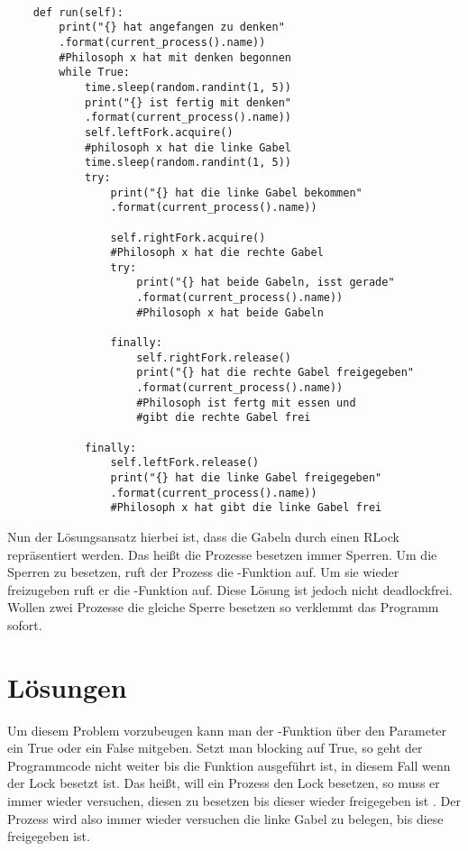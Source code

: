 \begin{lstlisting}[style = Python, label = {erste Lösung}, caption = {erste Lösung}]

    def run(self):
        print("{} hat angefangen zu denken"
        .format(current_process().name)) 
        #Philosoph x hat mit denken begonnen
        while True:
            time.sleep(random.randint(1, 5))
            print("{} ist fertig mit denken"
            .format(current_process().name))
            self.leftFork.acquire() 
            #philosoph x hat die linke Gabel
            time.sleep(random.randint(1, 5))
            try:
                print("{} hat die linke Gabel bekommen"
                .format(current_process().name))

                self.rightFork.acquire() 
                #Philosoph x hat die rechte Gabel
                try:
                    print("{} hat beide Gabeln, isst gerade"
                    .format(current_process().name)) 
                    #Philosoph x hat beide Gabeln

                finally:
                    self.rightFork.release()
                    print("{} hat die rechte Gabel freigegeben"
                    .format(current_process().name)) 
                    #Philosoph ist fertg mit essen und 
                    #gibt die rechte Gabel frei

            finally:
                self.leftFork.release()
                print("{} hat die linke Gabel freigegeben"
                .format(current_process().name)) 
                #Philosoph x hat gibt die linke Gabel frei

\end{lstlisting}

Nun der Lösungsansatz hierbei ist, dass die Gabeln durch einen RLock repräsentiert werden. Das heißt die Prozesse besetzen immer Sperren. Um die Sperren zu besetzen, ruft der Prozess die -Funktion auf. Um sie wieder freizugeben ruft er die -Funktion auf. Diese \glqq Lösung \grqq ist jedoch nicht deadlockfrei. Wollen zwei Prozesse die gleiche Sperre besetzen so verklemmt das Programm sofort. 

\section{Lösungen}
\label{endlösung}

Um diesem Problem vorzubeugen kann man der -Funktion über den Parameter  ein True oder ein False mitgeben. Setzt man blocking auf True, so geht der Programmcode nicht weiter bis die Funktion ausgeführt ist, in diesem Fall wenn der Lock besetzt ist. Das heißt, will ein Prozess den Lock besetzen, so muss er immer wieder versuchen, diesen zu besetzen bis dieser wieder freigegeben ist \parencite[vgl. ]{lock}. Der Prozess wird also immer wieder versuchen die linke Gabel zu belegen, bis diese freigegeben ist. 

